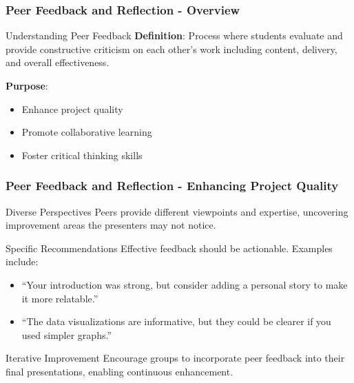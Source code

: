 \documentclass[aspectratio=169]{beamer}
\begin{document}
\begin{frame}[fragile]
    \frametitle{Peer Feedback and Reflection - Overview}
    
    \begin{block}{Understanding Peer Feedback}
        \textbf{Definition}: Process where students evaluate and provide constructive criticism on each other’s work including content, delivery, and overall effectiveness.
        
        \textbf{Purpose}:
        \begin{itemize}
            \item Enhance project quality
            \item Promote collaborative learning
            \item Foster critical thinking skills
        \end{itemize}
    \end{block}
\end{frame}

\begin{frame}[fragile]
    \frametitle{Peer Feedback and Reflection - Enhancing Project Quality}
    
    \begin{block}{Diverse Perspectives}
        Peers provide different viewpoints and expertise, uncovering improvement areas the presenters may not notice.
    \end{block}

    \begin{block}{Specific Recommendations}
        Effective feedback should be actionable. Examples include:
        \begin{itemize}
            \item ``Your introduction was strong, but consider adding a personal story to make it more relatable.''
            \item ``The data visualizations are informative, but they could be clearer if you used simpler graphs.''
        \end{itemize}
    \end{block}
    
    \begin{block}{Iterative Improvement}
        Encourage groups to incorporate peer feedback into their final presentations, enabling continuous enhancement.
    \end{block}
\end{frame}
\end{document}
